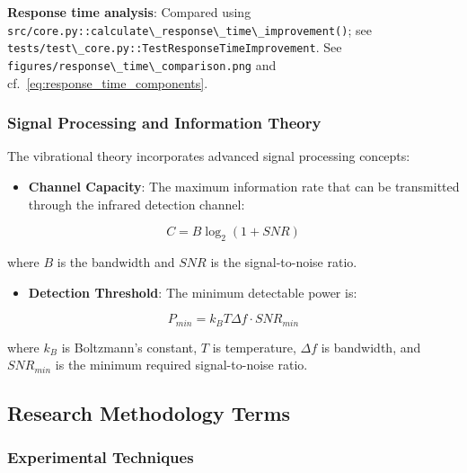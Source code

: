 \documentclass[
  13pt,
  a4paperpaper,
  12pt]{article}
\newcommand{\passthrough}[1]{#1}
\providecommand{\tightlist}{%
  \setlength{\itemsep}{0pt}\setlength{\parskip}{0pt}}
\begin{document}
\textbf{Response time analysis}: Compared using
\passthrough{\lstinline!src/core.py::calculate\_response\_time\_improvement()!};
see
\passthrough{\lstinline!tests/test\_core.py::TestResponseTimeImprovement!}.
See
\passthrough{\lstinline!figures/response\_time\_comparison.png!}
and cf.~\eqref{eq:response_time_components}.

\subsubsection{Signal Processing and Information
Theory}\label{signal-processing-and-information-theory}

The vibrational theory incorporates advanced signal processing concepts:

\begin{itemize}
\tightlist
\item
  \textbf{Channel Capacity}: The maximum information rate that can be
  transmitted through the infrared detection channel:
\end{itemize}

\begin{equation}
C = B \log_2(1 + SNR)
\label{eq:channel_capacity_gloss}
\end{equation}

where \(B\) is the bandwidth and \(SNR\) is the signal-to-noise ratio.

\begin{itemize}
\tightlist
\item
  \textbf{Detection Threshold}: The minimum detectable power is:
\end{itemize}

\begin{equation}
P_{min} = k_B T \Delta f \cdot SNR_{min}
\label{eq:min_power_gloss}
\end{equation}

where \(k_B\) is Boltzmann's constant, \(T\) is temperature,
\(\Delta f\) is bandwidth, and \(SNR_{min}\) is the minimum required
signal-to-noise ratio.

\subsection{Research Methodology
Terms}\label{research-methodology-terms}

\subsubsection{Experimental Techniques}\label{experimental-techniques}
\end{document}
